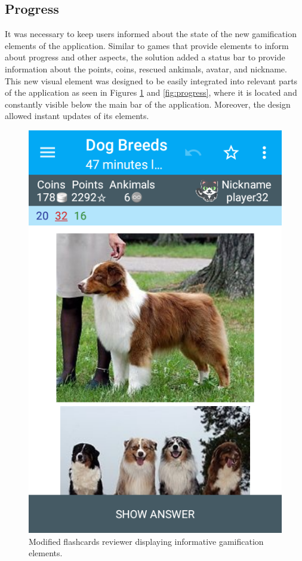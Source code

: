 \subsection{Progress}
It was necessary to keep users informed about the state of the new gamification elements of the application. Similar to games that provide elements to inform about progress and other aspects, the solution added a status bar to provide information about the points, coins, rescued ankimals, avatar, and nickname. This new visual element was designed to be easily integrated into relevant parts of the application as seen in Figures \ref{fig:reviewer-modified} and \ref{fig:progress}, where it is located and constantly visible below the main bar of the application. Moreover, the design allowed instant updates of its elements.

\begin{figure}[htb]
    \vskip 5mm
        \begin{center}
            \includegraphics[scale=0.4]{./Figures/modified_reviewer.png}
            \caption{Modified flashcards reviewer displaying informative gamification elements.}
            \label{fig:reviewer-modified}
        \end{center}
    \vskip -5mm
\end{figure}

